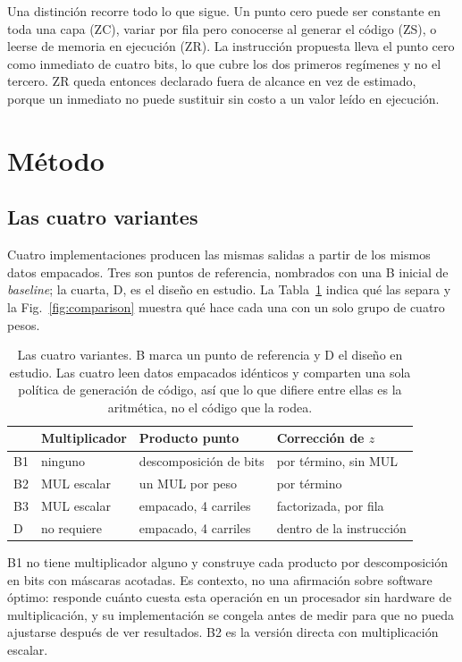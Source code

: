 Una distinción recorre todo lo que sigue. Un punto cero puede ser constante en
toda una capa (ZC), variar por fila pero conocerse al generar el código (ZS), o
leerse de memoria en ejecución (ZR). La instrucción propuesta lleva el punto
cero como inmediato de cuatro bits, lo que cubre los dos primeros regímenes y no
el tercero. ZR queda entonces declarado fuera de alcance en vez de estimado,
porque un inmediato no puede sustituir sin costo a un valor leído en ejecución.

\section{Método}
\subsection{Las cuatro variantes}
Cuatro implementaciones producen las mismas salidas a partir de los mismos datos
empacados. Tres son puntos de referencia, nombrados con una B inicial de
\emph{baseline}; la cuarta, D, es el diseño en estudio. La
Tabla~\ref{tab:variants} indica qué las separa y la
Fig.~\ref{fig:comparison} muestra qué hace cada una con un solo grupo de cuatro
pesos.

\begin{table}[!htbp]
\caption{Las cuatro variantes. B marca un punto de referencia y D el diseño en
estudio. Las cuatro leen datos empacados idénticos y comparten una sola política
de generación de código, así que lo que difiere entre ellas es la aritmética, no
el código que la rodea.}
\label{tab:variants}
\centering
\footnotesize
\begin{tabular}{llll}
\hline
 & Multiplicador & Producto punto & Corrección de $z$ \\
\hline
B1 & ninguno & descomposición de bits & por término, sin MUL \\
B2 & MUL escalar & un MUL por peso & por término \\
B3 & MUL escalar & empacado, 4 carriles & factorizada, por fila \\
D & no requiere & empacado, 4 carriles & dentro de la instrucción \\
\hline
\end{tabular}
\end{table}

B1 no tiene multiplicador alguno y construye cada producto por descomposición en
bits con máscaras acotadas. Es contexto, no una afirmación sobre software
óptimo: responde cuánto cuesta esta operación en un procesador sin hardware de
multiplicación, y su implementación se congela antes de medir para que no pueda
ajustarse después de ver resultados. B2 es la versión directa con multiplicación
escalar.

